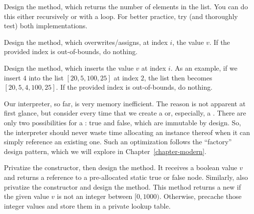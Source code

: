 
Design the  method, which returns the number of elements in the list. You can do this either recursively or with a loop. For better practice, try (and thoroughly test) both implementations.

Design the  method, which overwrites/assigns, at index $i$, the value $v$. If the provided index is out-of-bounds, do nothing.

Design the  method, which inserts the value $v$ at index $i$. As an example, if we insert $4$ into the list $[20, 5, 100, 25]$ at index $2$, the list then becomes $[20, 5, 4, 100, 25]$. If the provided index is out-of-bounds, do nothing.

Our interpreter, so far, is very memory inefficient. The reason is not apparent at first glance, but consider every time that we create a  or, especially, a . There are only two possibilities for a : true and false, which are immutable by design. So, the interpreter should never waste time allocating an instance thereof when it can simply reference an existing one. Such an optimization follows the ``factory'' design pattern, which we will explore in Chapter~\ref{chapter-modern}.

Privatize the  constructor, then design the  method. It receives a boolean value $v$ and returns a reference to a pre-allocated static true or false node. Similarly, also privatize the  constructor and design the  method. This method returns a new  if the given value $v$ is not an integer between $[0, 1000)$. Otherwise, precache those integer values and store them in a private lookup table.

